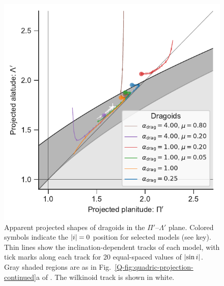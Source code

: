 \begin{figure}
  \centering
  \includegraphics[width=\linewidth]{figs/dragoid-R90-vs-Rc}
  \caption{Apparent projected shapes of dragoids in the
    \(\Pi'\)--\(\Lambda'\) plane. Colored symbols indicate the
    \(\lvert i\rvert = 0\) position for selected models (see key).  Thin
    lines show the inclination-dependent tracks of each model, with
    tick marks along each track for 20 equal-spaced values of
    \(\lvert\sin i\rvert\). Gray shaded regions are as in
    Fig.~\ref{Q-fig:quadric-projection-continued}a of \PaperI{}.  The
    wilkinoid track is shown in white. }
  \label{fig:dragoid-Rc-R90}
\end{figure}

